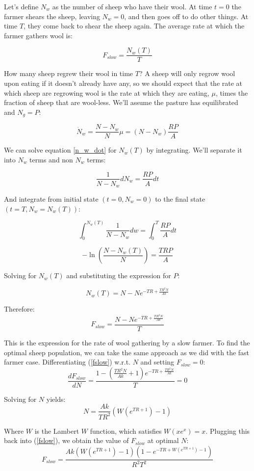 \documentclass{article}
\theoremstyle{theorem}
\theoremstyle{definition}
\begin{document}
Let's define $N_w$ as the number of sheep who have their wool. At time $t=0$ the farmer shears the sheep, leaving $N_w=0$, and then goes off to do other things. At time $T$, they come back to shear the sheep again. The average rate at which the farmer gathers wool is:

$$F_{slow}=\frac{N_w(T)}{T}$$

How many sheep regrew their wool in time $T$? A sheep will only regrow wool upon eating if it doesn't already have any, so we should expect that the rate at which sheep are regrowing wool is the rate at which they are eating, $\mu$, times the fraction of sheep that are wool-less. We'll assume the pasture has equilibrated and $N_g=P$:

\begin{equation}
    \label{n_w_dot}
    \dot{N}_w=\frac{N-N_w}{N}\mu=(N-N_w)\frac{RP}{A}
\end{equation}

We can solve equation \ref{n_w_dot} for $N_w(T)$ by integrating. We'll separate it into $N_w$ terms and non $N_w$ terms:

$$\frac{1}{N-N_w}dN_w=\frac{RP}{A}dt$$

And integrate from initial state $(t=0, N_w=0)$ to the final state $(t=T, N_w=N_w(T))$:

$$\int_{0}^{N_w(T)}\frac{1}{N-N_w}dw=\int_{0}^{T}\frac{RP}{A}dt$$

$$-\ln\left(\frac{N-N_w(T)}{N}\right)=\frac{TRP}{A}$$

Solving for $N_w(T)$ and substituting the expression for $P$:

$$N_w(T)=N-Ne^{-TR+\frac{TR^2N}{Ak}}$$

Therefore:
\begin{equation}
    \label{fslow}
    F_{slow}=\frac{N-Ne^{-TR+\frac{TR^2N}{Ak}}}{T}
\end{equation}

This is the expression for the rate of wool gathering by a slow farmer. To find the optimal sheep population, we can take the same approach as we did with the fast farmer case. Differentiating (\ref{fslow}) w.r.t. $N$ and setting $F_{slow}=0$:
$$\frac{dF_{slow}}{dN}=\frac{1-\left(\frac{TR^2N}{Ak}+1\right)e^{-TR+\frac{TR^2N}{Ak}}}{T}=0$$

Solving for $N$ yields:
\begin{equation}
    \label{fslow_optimal_n}
    N=\frac{Ak}{TR^2}(W(e^{TR+1})-1) 
\end{equation}

Where $W$ is the Lambert $W$ function, which satisfies $W(xe^x)=x$. Plugging this back into (\ref{fslow}), we obtain the value of $F_{slow}$ at optimal $N$:
\begin{equation}
    \label{fslow_at_optimal_n}
    F_{slow}=\frac{Ak(W(e^{TR+1})-1)(1-e^{-TR+W(e^{TR+1})-1})}{R^2T^2}
\end{equation}
\end{document}
